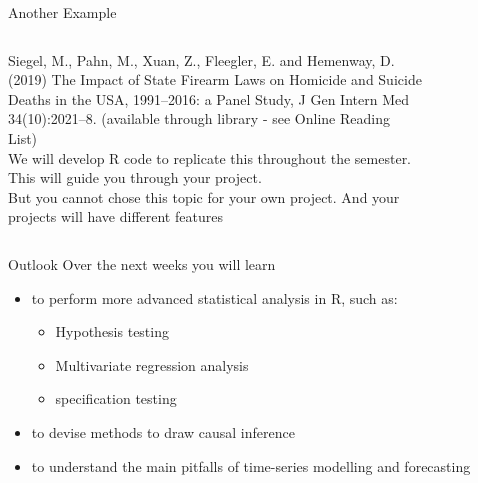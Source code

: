 \documentclass[
  ignorenonframetext,
]{beamer}
\begin{document}
\begin{frame}{Another Example}
\label{another-example}
\begin{columns}
  
  \begin{column}{0.5\textwidth}
    \small
    Siegel, M., Pahn, M., Xuan, Z., Fleegler, E. and Hemenway, D. (2019) The Impact of State Firearm Laws on Homicide and Suicide Deaths in the USA, 1991–2016: a Panel Study, J Gen Intern Med 34(10):2021–8. (available through library - see Online Reading List)\\
    \vskip 10pt
    We will develop R code to replicate this throughout the semester. This will guide you through your project.\\
    But you cannot chose this topic for your own project. And your projects will have different features
    \normalsize


  \end{column}
  \begin{column}{0.5\textwidth}
    \begin{figure}
        \centering
        \includegraphics[width=5cm]{SiegelExtract.png}\\
    \end{figure}

  \end{column}
    
\end{columns}
\end{frame}

\begin{frame}{Outlook}
\label{outlook}
Over the next weeks you will learn

\begin{itemize}
  \item to perform more advanced statistical analysis in R, such as:
      \begin{itemize}
        \item Hypothesis testing
        \item Multivariate regression analysis
        \item specification testing
      \end{itemize}
  \item to devise methods to draw causal inference
  \item to understand the main pitfalls of time-series modelling and forecasting
\end{itemize}
\end{frame}
\end{document}
